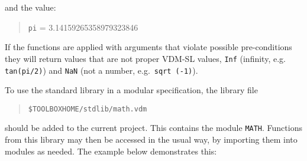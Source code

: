 \documentclass[\pformat,12pt]{article}
\newcommand{\vdmslpp}[2]{%
#1
}
\newcommand{\vdmsl}{VDM-SL}
\newcommand{\vdmpp}{VDM++}
\begin{document}
and the value:

\begin{quote}
\texttt{pi} = 3.14159265358979323846
\end{quote}

If the functions are applied with arguments that violate possible
pre-conditions they will return values that are not proper
\vdmslpp{\vdmsl}{\vdmpp} values, {\tt Inf} (infinity, e.g.\ {\tt
  tan(pi/2)}) and {\tt NaN} (not a number, e.g.\ {\tt sqrt (-1)}).


% 
% 
% 
% 
% 
% 
% 
% 
To use the standard library in a modular specification, the library file 
\begin{quote}
\verb+$TOOLBOXHOME/stdlib/math.vdm+
\end{quote}
should be added to the
current project. This contains the module \texttt{MATH}. Functions
from this library may then be accessed in the usual way, by importing
them into modules as needed. The example below demonstrates this:
\end{document}
